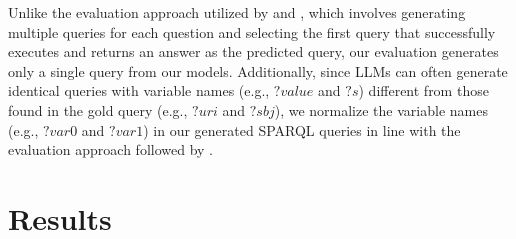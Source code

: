Unlike the evaluation approach utilized by \citet{banerjee} and \citet{qi2024enhancing}, which involves generating multiple queries for each question and selecting the first query that successfully executes and returns an answer as the predicted query, our evaluation generates only a single query from our models. 
Additionally, since LLMs can often generate identical queries with variable names (e.g., $?value$ and $?s$) different from those found in the gold query (e.g., $?uri$ and $?sbj$), we normalize the variable names (e.g., $?var0$ and $?var1$) in our generated SPARQL queries in line with the evaluation approach followed by \citet{qi2024enhancing}.





\section{Results}
\label{sec:results}


